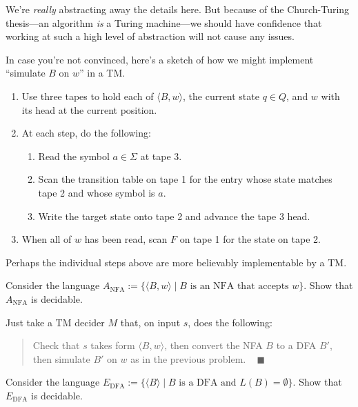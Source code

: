 We're \emph{really} abstracting away the details here.
But because of the Church-Turing thesis---an algorithm
\emph{is} a Turing machine---we should have confidence
that working at such a high level of abstraction
will not cause any issues.

\begin{remark}
    In case you're not convinced,
    here's a sketch of how we might implement
    ``simulate $B$ on $w$'' in a TM.
    \begin{enumerate}
        \item Use three tapes to hold each of
        $\langle B, w \rangle$, the current state $q \in Q$,
        and $w$ with its head at the current position.
        \item At each step, do the following:
        \begin{enumerate}
            \item Read the symbol $a \in \Sigma$ at tape 3.
            \item Scan the transition table on tape 1 for the entry
            whose state matches tape 2 and whose symbol is $a$.
            \item Write the target state onto tape 2
            and advance the tape 3 head.
        \end{enumerate}
        \item When all of $w$ has been read,
        scan $F$ on tape 1 for the state on tape 2.
    \end{enumerate}
    Perhaps the individual steps above
    are more believably implementable by a TM.
\end{remark}

\begin{problem}
    Consider the language
    $A_{\mathrm{NFA}} := \{\langle B, w \rangle \mid
    B \text{ is an NFA that accepts } w\}$.
    Show that $A_{\mathrm{NFA}}$ is decidable.
\end{problem}

\begin{solution}
    Just take a TM decider $M$ that, on input $s$,
    does the following:
    \begin{quote}
        Check that $s$ takes form $\langle B, w \rangle$,
        then convert the NFA $B$ to a DFA $B'$,
        then simulate $B'$ on $w$ as in the previous problem.
        ~ $\blacksquare$
    \end{quote}
\end{solution}

\begin{problem}
    Consider the language
    $E_{\mathrm{DFA}} := \{\langle B \rangle \mid
    B \text{ is a DFA and } L(B) = \emptyset\}$.
    Show that $E_{\mathrm{DFA}}$ is decidable.
\end{problem}

